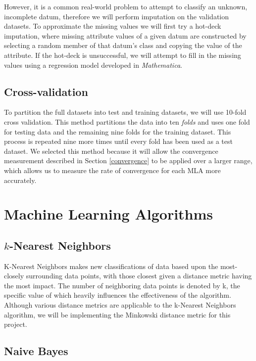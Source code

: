 \documentclass{article}
\begin{document}
			However, it is a common real-world problem to attempt to classify an unknown, incomplete datum, therefore we will perform imputation on the validation datasets. 
			To approximate the missing values we will first try a hot-deck imputation, where missing attribute values of a given datum are constructed by selecting a random member of that datum's class and copying the value of the attribute. 
			If the hot-deck is unsuccessful, we will attempt to fill in the missing values using a regression model developed in \textit{Mathematica}.
		\subsection{Cross-validation}
			\label{cv}
			To partition the full datasets into test and training datasets, we will use 10-fold cross validation. 
			This method partitions the data into ten \textit{folds} and uses one fold for testing data and the remaining nine folds for the training dataset. 
			This process is repeated nine more times until every fold has been used as a test dataset. 
			We selected this method because it will allow the convergence measurement described in Section \ref{convergence} to be applied over a larger range, which allows us to measure the rate of convergence for each MLA more accurately.
	\section{Machine Learning Algorithms}
		\label{mla}
		\subsection{$k$-Nearest Neighbors}
			K-Nearest Neighbors makes new classifications of data based upon the most-closely surrounding data points, with those closest given a distance metric having the most impact.  The number of neighboring data points is denoted by k, the specific value of which heavily influences the effectiveness of the algorithm.  Although various distance metrics are applicable to the k-Nearest Neighbors algorithm, we will be implementing the Minkowski distance metric for this project.
		\subsection{Naive Bayes}
			\label{nbw}
\end{document}
